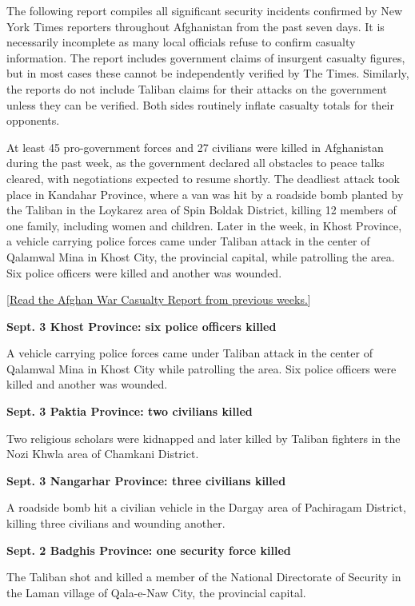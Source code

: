The following report compiles all significant security incidents
confirmed by New York Times reporters throughout Afghanistan from the
past seven days. It is necessarily incomplete as many local officials
refuse to confirm casualty information. The report includes government
claims of insurgent casualty figures, but in most cases these cannot be
independently verified by The Times. Similarly, the reports do not
include Taliban claims for their attacks on the government unless they
can be verified. Both sides routinely inflate casualty totals for their
opponents.

At least 45 pro-government forces and 27 civilians were killed in
Afghanistan during the past week, as the government declared all
obstacles to peace talks cleared, with negotiations expected to resume
shortly. The deadliest attack took place in Kandahar Province, where a
van was hit by a roadside bomb planted by the Taliban in the Loykarez
area of Spin Boldak District, killing 12 members of one family,
including women and children. Later in the week, in Khost Province, a
vehicle carrying police forces came under Taliban attack in the center
of Qalamwal Mina in Khost City, the provincial capital, while patrolling
the area. Six police officers were killed and another was wounded.

{[}\href{https://www.nytimes3xbfgragh.onion/spotlight/afghan-war-casualty-reports}{Read
the Afghan War Casualty Report from previous weeks.}{]}

\textbf{Sept. 3 Khost Province: six police officers killed}

A vehicle carrying police forces came under Taliban attack in the center
of Qalamwal Mina in Khost City while patrolling the area. Six police
officers were killed and another was wounded.

\textbf{Sept. 3 Paktia Province: two civilians killed}

Two religious scholars were kidnapped and later killed by Taliban
fighters in the Nozi Khwla area of Chamkani District.

\textbf{Sept. 3 Nangarhar Province: three civilians killed}

A roadside bomb hit a civilian vehicle in the Dargay area of Pachiragam
District, killing three civilians and wounding another.

\textbf{Sept. 2 Badghis Province: one security force killed}

The Taliban shot and killed a member of the National Directorate of
Security in the Laman village of Qala-e-Naw City, the provincial
capital.

